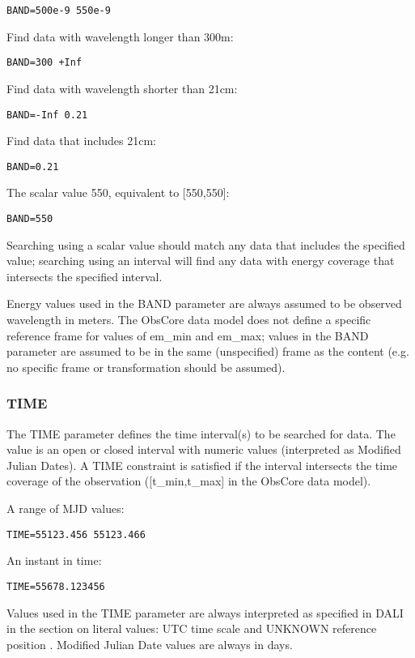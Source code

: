 \documentclass[11pt,a4paper]{ivoa}
\begin{document}
\begin{lstlisting}
BAND=500e-9 550e-9
\end{lstlisting}
Find data with wavelength longer than 300m:
\begin{lstlisting}
BAND=300 +Inf
\end{lstlisting}
Find data with wavelength shorter than 21cm:
\begin{lstlisting}
BAND=-Inf 0.21
\end{lstlisting}
Find data that includes 21cm:
\begin{lstlisting}
BAND=0.21
\end{lstlisting}
The scalar value 550, equivalent to [550,550]:
\begin{lstlisting}
BAND=550
\end{lstlisting}


Searching using a scalar value should match any data that includes the specified value; searching using an interval will find any data with energy coverage that intersects the specified interval.

Energy values used in the BAND parameter are always assumed to be  observed wavelength in meters. The ObsCore data model does not define a specific reference frame for values of em\_min and em\_max; values in the BAND parameter are assumed to be in the same (unspecified) frame as the content (e.g. no specific frame or transformation should be assumed). 

\subsubsection{TIME}
\label{sec:TIME}

The TIME parameter defines the time interval(s) to be searched for data. The value is an open or closed interval with numeric values (interpreted as Modified Julian Dates). A TIME constraint is satisfied if the interval intersects the time coverage of the observation ([t\_min,t\_max] in the ObsCore data model).

A range of MJD values:

\begin{lstlisting}
TIME=55123.456 55123.466
\end{lstlisting}

An instant in time:

\begin{lstlisting}
TIME=55678.123456
\end{lstlisting}

Values used in the TIME parameter are always interpreted as specified in DALI in the section on literal values: UTC time scale and UNKNOWN reference position \citep{std:STC}. Modified Julian Date values are always in days.
\end{document}
